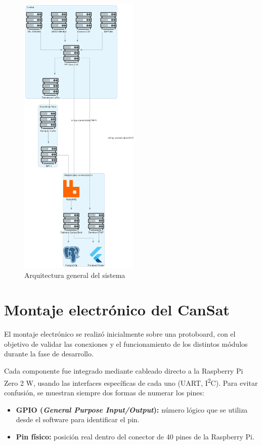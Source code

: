 \begin{figure}[H]
    \centering
    \includegraphics[width=0.51\textwidth]{Imagenes/Bitmap/cansat_architecture}
    \caption{Arquitectura general del sistema}
    \label{fig:cansat_architecture}
\end{figure}


\section{Montaje electrónico del CanSat}
El montaje electrónico se realizó inicialmente sobre una protoboard, con el objetivo de validar las conexiones y el funcionamiento de los distintos módulos durante la fase de desarrollo.

Cada componente fue integrado mediante cableado directo a la Raspberry Pi Zero 2 W, usando las interfaces específicas de cada uno (UART, I\textsuperscript{2}C). Para evitar confusión, se muestran siempre dos formas de numerar los pines:

\begin{itemize}
    \item \textbf{GPIO (\emph{General Purpose Input/Output}):} número lógico que se utiliza desde el software para identificar el pin.
    \item \textbf{Pin físico:} posición real dentro del conector de 40 pines de la Raspberry Pi.
\end{itemize}

